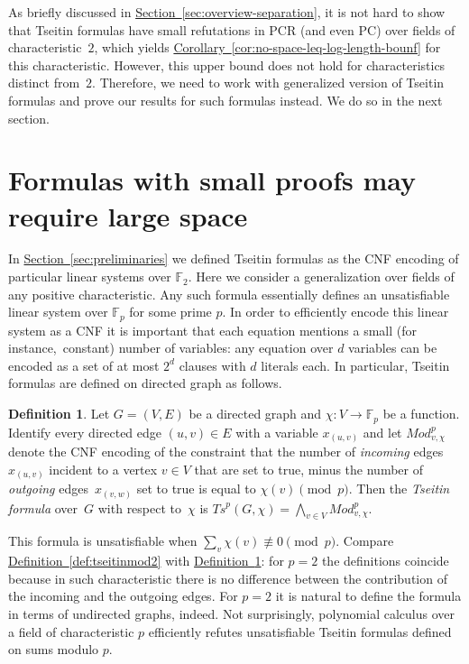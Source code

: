 \documentclass[11pt]{article}
\numberwithin{equation}{section}
\theoremstyle{definition}
\newtheorem{definition}[theorem]{Definition}
\theoremstyle{plain}
\newcommand{\expref}[2]{\hyperref[#2]{#1~\ref{#2}}}
\theoremstyle{plain}
\theoremstyle{definition}
\newcommand{\refcor}[1]{\expref{Corollary}{#1}}
\newcommand{\refdef}[1]{\expref{Definition}{#1}}
\newcommand{\refsec}[1]{\expref{Section}{#1}}
\newcommand{\fieldstd}{\mathbb{F}}
\newcommand{\funcdescr}[3]{\ensuremath{ #1 : #2 \to #3}}
\newcommand{\introduceterm}[1]{{\emph{#1}}}
\newcommand{\wrt}{with respect to\xspace}
\newcommand{\egComma}{for instance,\ }
\newcommand{\formulaformat}[1]{\mathit{#1}}
\newcommand{\tseitinmodpnot}[2]{\formulaformat{Ts}^{p}({#1,#2})}
\newcommand{\tseitinmodpflow}[2]{\ensuremath{\formulaformat{Mod}^{p}_{#1,#2}}}
\newcommand{\tseitincharge}{\chi}
\begin{document}
As briefly discussed in 
\refsec{sec:overview-separation}, 
it is not hard to show that Tseitin formulas have small 
refutations in PCR (and even PC) over fields of characteristic~$2$,
which yields
\refcor{cor:no-space-leq-log-length-bounf} 
for this characteristic. 
However, this upper bound does not hold for characteristics distinct
from~$2$. 
%
Therefore, we need to work with generalized version of Tseitin formulas
and prove our results for such formulas instead. We do so in the next section.
%

\section{Formulas with small proofs may require large space}
\label{sec:tseitinseparation}

In \expref{Section}{sec:preliminaries} we defined Tseitin formulas as the
CNF encoding of particular linear systems over $\fieldstd_{2}$.  Here we
consider a generalization over fields of any positive characteristic.
%
Any such formula essentially defines an unsatisfiable linear system over
$\fieldstd_{p}$ for some prime $p$. In order to efficiently encode this
linear system as a CNF it is important that each equation mentions a
small (\egComma constant) number of variables: any equation over $d$
variables can be encoded as a set of at most $2^{d}$ clauses with $d$
literals each.  In particular, Tseitin formulas are defined on
directed graph as follows.

\begin{definition}\label{def:tseitinmodp}
  Let $G = (V,E)$ be a directed graph and
  $\funcdescr{\tseitincharge}{V}{\fieldstd_p}$
  be a function.
  Identify every directed edge $(u,v) \in E$ with a variable $x_{(u,v)}$
  and  let
  $\tseitinmodpflow{v}{\tseitincharge}$
  denote the CNF encoding
  of the constraint
  that the number of \emph{incoming} edges~$x_{(u,v)}$ incident to a vertex $v \in V$ that are set to true, minus the number of \emph{outgoing} edges~$x_{(v,w)}$ set to true is equal to $\tseitincharge(v) \pmod{p}$.
  Then the \introduceterm{Tseitin formula} over~$G$ \wrt{}~$\tseitincharge$
  is $\tseitinmodpnot{G}{\tseitincharge}=
  \bigwedge_{v\in V}\tseitinmodpflow{v}{\tseitincharge}$.
\end{definition}

This formula is unsatisfiable when $\sum_{v}\tseitincharge(v)\not\equiv 0
\pmod{p}$. Compare \refdef{def:tseitinmod2} with
\refdef{def:tseitinmodp}: for $p=2$ the definitions
coincide because in such characteristic there is no difference
between the contribution of the incoming and the outgoing edges. For
$p=2$ it is natural to define the formula in terms of undirected
graphs, indeed.
%
Not surprisingly, polynomial calculus over a field of characteristic
$p$ efficiently refutes unsatisfiable Tseitin formulas defined on
sums modulo $p$.
\end{document}
